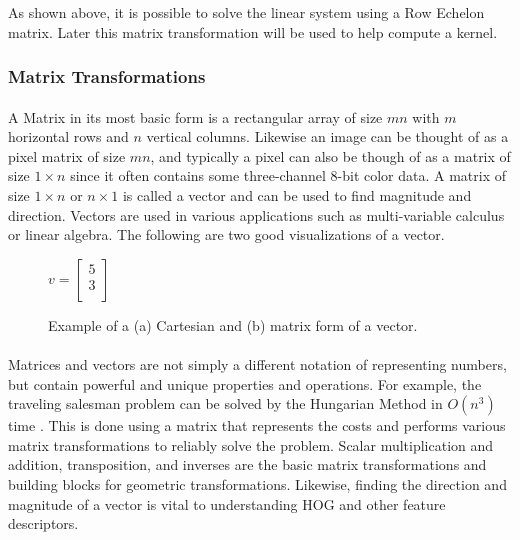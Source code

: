\documentclass[11pt]{article}
\newcommand\simpleparagraph[1]{%
	\stepcounter{paragraph}\paragraph*{\theparagraph\quad{}#1}}
\renewcommand\theparagraph{}
\begin{document}
As shown above, it is possible to solve the linear system using a Row Echelon matrix. Later this matrix transformation will be used to help compute a kernel.

\subsubsection{Matrix Transformations}
\simpleparagraph{}
A Matrix in its most basic form is a rectangular array of size $mn$ with $m$ horizontal rows and $n$ vertical columns. Likewise an image can be thought of as a pixel matrix of size $mn$, and typically a pixel can also be though of as a matrix of size $1\times n$ since it often contains some three-channel 8-bit color data. A matrix of size $1\times n$ or $n\times 1$ is called a vector and can be used to find magnitude and direction. Vectors are used in various applications such as multi-variable calculus or linear algebra. The following are two good visualizations of a vector.
\begin{figure}[h]
	\centering
	\begin{minipage}[a]{0.5\textwidth}
	\end{minipage}
	\hfill
	\begin{minipage}[b]{0.4\textwidth}
		\centering
		{\large
			$v = 
			\begin{bmatrix}
			5 \\
			3 \\
			\end{bmatrix}$
		}
	\end{minipage}
	\hfill
	\caption{Example of a (a) Cartesian and (b) matrix form of a vector.}
	\label{equ:basicVector}
\end{figure}
\paragraph[Road-Map]{}
Matrices and vectors are not simply a different notation of representing numbers, but contain powerful and unique properties and operations. For example, the traveling salesman problem can be solved by the Hungarian Method in $O(n^{3})$ time \cite{baripada_college_hungarian_2017}. This is done using a matrix that represents the costs and performs various matrix transformations to reliably solve the problem. Scalar multiplication and addition, transposition, and inverses are the basic matrix transformations and building blocks for geometric transformations. Likewise, finding the direction and magnitude of a vector is vital to understanding HOG and other feature descriptors.
\end{document}
